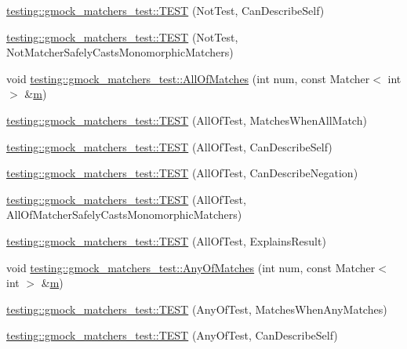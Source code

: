 \begin{DoxyCompactItemize}
\item 
\hyperlink{namespacetesting_1_1gmock__matchers__test_a831db2bf90c3950953cdceaefebddd40}{testing\+::gmock\+\_\+matchers\+\_\+test\+::\+T\+E\+ST} (Not\+Test, Can\+Describe\+Self)
\item 
\hyperlink{namespacetesting_1_1gmock__matchers__test_a46849e0c019e331f830ed91137fa417a}{testing\+::gmock\+\_\+matchers\+\_\+test\+::\+T\+E\+ST} (Not\+Test, Not\+Matcher\+Safely\+Casts\+Monomorphic\+Matchers)
\item 
void \hyperlink{namespacetesting_1_1gmock__matchers__test_a51d8731c3824a6acdaa594645dd46779}{testing\+::gmock\+\_\+matchers\+\_\+test\+::\+All\+Of\+Matches} (int num, const Matcher$<$ int $>$ \&\hyperlink{app_2main_8cpp_a0d2d8836216fc94b61aa0824eb239db2}{m})
\item 
\hyperlink{namespacetesting_1_1gmock__matchers__test_a7714d041eb2dd2e233db7f175fedef5a}{testing\+::gmock\+\_\+matchers\+\_\+test\+::\+T\+E\+ST} (All\+Of\+Test, Matches\+When\+All\+Match)
\item 
\hyperlink{namespacetesting_1_1gmock__matchers__test_a31056975d89eea2786997cf18b086bf4}{testing\+::gmock\+\_\+matchers\+\_\+test\+::\+T\+E\+ST} (All\+Of\+Test, Can\+Describe\+Self)
\item 
\hyperlink{namespacetesting_1_1gmock__matchers__test_a86c15b3bc163321c7a56aeb0b1709b87}{testing\+::gmock\+\_\+matchers\+\_\+test\+::\+T\+E\+ST} (All\+Of\+Test, Can\+Describe\+Negation)
\item 
\hyperlink{namespacetesting_1_1gmock__matchers__test_a4196a4000390e2378954d55b4f6d2893}{testing\+::gmock\+\_\+matchers\+\_\+test\+::\+T\+E\+ST} (All\+Of\+Test, All\+Of\+Matcher\+Safely\+Casts\+Monomorphic\+Matchers)
\item 
\hyperlink{namespacetesting_1_1gmock__matchers__test_a2b9f4a791dd4f1fb9f8a1400883a5db4}{testing\+::gmock\+\_\+matchers\+\_\+test\+::\+T\+E\+ST} (All\+Of\+Test, Explains\+Result)
\item 
void \hyperlink{namespacetesting_1_1gmock__matchers__test_aa4e9deb0a98413e62516451e7c060c7a}{testing\+::gmock\+\_\+matchers\+\_\+test\+::\+Any\+Of\+Matches} (int num, const Matcher$<$ int $>$ \&\hyperlink{app_2main_8cpp_a0d2d8836216fc94b61aa0824eb239db2}{m})
\item 
\hyperlink{namespacetesting_1_1gmock__matchers__test_a4949d40a1ac77182274189c21848af00}{testing\+::gmock\+\_\+matchers\+\_\+test\+::\+T\+E\+ST} (Any\+Of\+Test, Matches\+When\+Any\+Matches)
\item 
\hyperlink{namespacetesting_1_1gmock__matchers__test_a00bd490bf974b3f3485a1b0fde9fa490}{testing\+::gmock\+\_\+matchers\+\_\+test\+::\+T\+E\+ST} (Any\+Of\+Test, Can\+Describe\+Self)

\end{DoxyCompactItemize}
